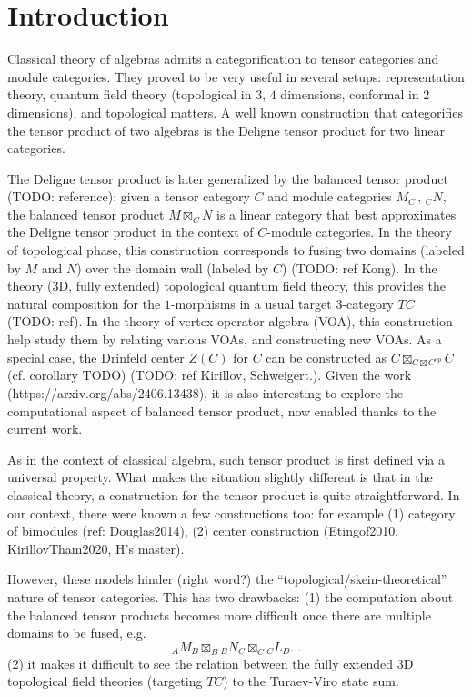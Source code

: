 
\section{Introduction}

Classical theory of algebras admits a categorification to tensor categories
and module categories. They proved to be very useful in several setups:
representation theory, quantum field theory (topological in $3$, $4$
dimensions, conformal in $2$ dimensions), and topological matters. A well
known construction that categorifies the tensor product of two algebras is the
Deligne tensor product for two linear categories.

The Deligne tensor product is later generalized by the balanced tensor product
(TODO: reference): given a tensor category $C$ and module categories
$M_{C} \,,\, {}_{C}N$, the balanced tensor product $M \boxtimes_{C} N$ is a linear
category that best approximates the Deligne tensor product in the context of
$C$-module categories. In the theory of topological phase, this construction
corresponds to fusing two domains (labeled by $M$ and $N$) over the domain
wall (labeled by $C$) (TODO: ref Kong). In the theory ($3$D, fully extended)
topological quantum field theory, this provides the natural composition for
the $1$-morphisms in a usual target $3$-category $TC$ (TODO: ref). In the
theory of vertex operator algebra (VOA), this construction help study them by
relating various VOAs, and constructing new VOAs. As a special case, the
Drinfeld center $Z(C)$ for $C$ can be constructed as $C \boxtimes_{C \boxtimes C^{op}} C$ (cf.
corollary TODO) (TODO: ref Kirillov, Schweigert.). Given the work
(https://arxiv.org/abs/2406.13438), it is also interesting to explore the
computational aspect of balanced tensor product, now enabled thanks to the
current work.

As in the context of classical algebra, such tensor product is first defined
via a universal property. What makes the situation slightly different is that
in the classical theory, a construction for the tensor product is quite
straightforward. In our context, there were known a few constructions too: for
example (1) category of bimodules (ref: Douglas2014), (2) center construction
(Etingof2010, KirillovTham2020, H's master).

However, these models hinder (right word?) the
``topological/skein-theoretical'' nature of tensor categories. This has two drawbacks: (1) the computation about the balanced tensor products becomes more difficult once there are multiple domains to be fused, e.g.
\[ {}_{A}{M}_{B} \boxtimes_{B} {}_{B}{N}_{C} \boxtimes_{{C}} {}_{C}{L}_{D} \ldots
\]
(2) it makes it difficult to see the relation between the fully extended $3$D
topological field theories (targeting $TC$) to the Turaev-Viro state sum.


